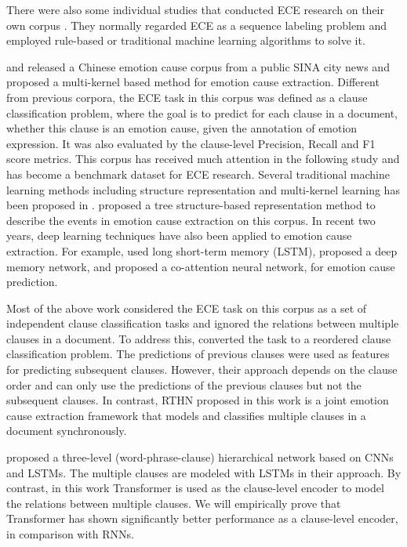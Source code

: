 \documentclass{article}
\begin{document}
There were also some individual studies that conducted ECE research on their own corpus \cite{russo2011emocause,neviarouskaya2013extracting,ghazi2015detecting,song2015detecting,yada2017bootstrap}. They normally regarded ECE as a sequence labeling problem and employed rule-based or traditional machine learning algorithms to solve it.

\cite{gui2016event} and \cite{gui2016emotion} released a Chinese emotion cause corpus from a public SINA city news and proposed a multi-kernel based method for emotion cause extraction. Different from previous corpora, the ECE task in this corpus was defined as a clause classification problem, where the goal is to predict for each clause in a document, whether this clause is an emotion cause, given the annotation of emotion expression. It was also evaluated by the clause-level Precision, Recall and F1 score metrics. This corpus has received much attention in the following study and has become a benchmark dataset for ECE research. Several traditional machine learning methods including structure representation and multi-kernel learning has been proposed in \cite{gui2016emotion,xu2017ensemble}. \cite{gui2016event} proposed a tree structure-based representation method to describe the events in emotion cause extraction on this corpus. In recent two years, deep learning techniques have also been applied to emotion cause extraction. For example, \cite{cheng2017emotion} used long short-term memory (LSTM), \cite{gui2017question} proposed a deep memory network, and \cite{li2018co} proposed a co-attention neural network, for emotion cause prediction.

Most of the above work considered the ECE task on this corpus as a set of independent clause classification tasks and ignored the relations between multiple clauses in a document. To address this, \cite{ding2019independent} converted the task to a reordered clause classification problem. The predictions of previous clauses were used as features for predicting subsequent clauses. However, their approach depends on the clause order and can only use the predictions of the previous clauses but not the subsequent clauses. In contrast, RTHN proposed in this work is a joint emotion cause extraction framework that models and classifies multiple clauses in a document synchronously.

\cite{yu2019multiple} proposed a three-level (word-phrase-clause) hierarchical network based on CNNs and LSTMs. The multiple clauses are modeled with LSTMs in their approach. By contrast, in this work Transformer is used as the clause-level encoder to model the relations between multiple clauses. We will empirically prove that Transformer has shown significantly better performance as a clause-level encoder, in comparison with RNNs.
\end{document}
